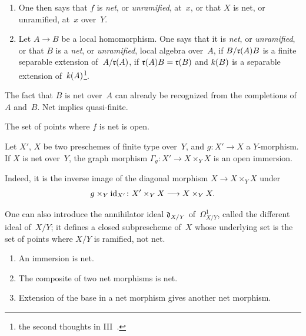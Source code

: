 \begin{definition}
\label{I.3.2}
\begin{enumerate}
\item[a)] One then says that $f$ is \emph{net}, or
\emph{unramified}, at~$x$, or that $X$ is net, or unramified,
at~$x$ over~$Y$.
\item[b)] Let $A\to B$ be a local homomorphism. One says that it
is \emph{net}, or \emph{unramified}, or that $B$ is a \emph{net},
or \emph{unramified}, local algebra over~$A$, if $B/\mathfrak{r}(A)B$
is a finite separable extension of~$A/\mathfrak{r}(A)$, \ie if
$\mathfrak{r}(A)B=\mathfrak{r}(B)$ and $\mathit{k}(B)$ is a separable extension
of~$\mathit{k}(A)$\footnote{\Cf the second thoughts in
III~.}.
\end{enumerate}
\end{definition}

\begin{remarks}
The fact
that $B$ is net over~$A$ can already be recognized from the
completions of~$A$ and~$B$. Net implies quasi-finite.
\end{remarks}

\begin{corollary}
\label{I.3.3}
The set of points where $f$ is net is open.
\end{corollary}

\begin{corollary}
\label{I.3.4}
Let $X'$, $X$ be two preschemes of finite type over~$Y$, and
$g\colon X'\to X$ a $Y$-morphism. If $X$ is net over~$Y$, the
graph morphism $\Gamma_g\colon X'\to X\times_Y X$ is an open
immersion.
\end{corollary}

Indeed, it is the inverse image of the diagonal morphism
$X\to X\times_Y X$ under
\[
g\times_Y\id_{X'}\colon X'\times_Y X\to X\times_Y X.
\]

One can also introduce the annihilator ideal $\mathfrak{d}_{X/Y}$
of~$\mathit{\Omega}^1_{X/Y}$, called the different ideal
of~$X/Y$; it defines a closed subprescheme of~$X$ whose underlying
set is the set of points where $X/Y$ is ramified, \ie not net.

\begin{proposition}
\label{I.3.5}
\begin{enumerate}
\item[(i)] An immersion is net.
\item[(ii)] The composite of two net morphisms is net.
\item[(iii)] Extension of the base in a net morphism gives another
net morphism.
\end{enumerate}
\end{proposition}

